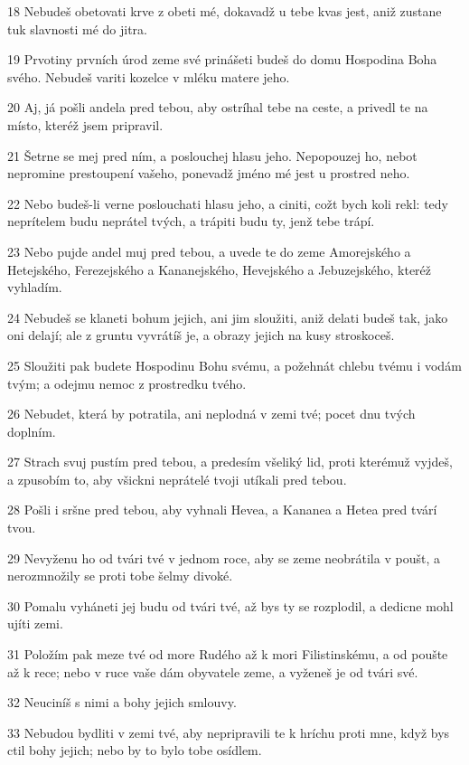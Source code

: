 \par 18 Nebudeš obetovati krve z obeti mé, dokavadž u tebe kvas jest, aniž zustane tuk slavnosti mé do jitra.
\par 19 Prvotiny prvních úrod zeme své prinášeti budeš do domu Hospodina Boha svého. Nebudeš variti kozelce v mléku matere jeho.
\par 20 Aj, já pošli andela pred tebou, aby ostríhal tebe na ceste, a privedl te na místo, kteréž jsem pripravil.
\par 21 Šetrne se mej pred ním, a poslouchej hlasu jeho. Nepopouzej ho, nebot nepromine prestoupení vašeho, ponevadž jméno mé jest u prostred neho.
\par 22 Nebo budeš-li verne poslouchati hlasu jeho, a ciniti, cožt bych koli rekl: tedy neprítelem budu neprátel tvých, a trápiti budu ty, jenž tebe trápí.
\par 23 Nebo pujde andel muj pred tebou, a uvede te do zeme Amorejského a Hetejského, Ferezejského a Kananejského, Hevejského a Jebuzejského, kteréž vyhladím.
\par 24 Nebudeš se klaneti bohum jejich, ani jim sloužiti, aniž delati budeš tak, jako oni delají; ale z gruntu vyvrátíš je, a obrazy jejich na kusy stroskoceš.
\par 25 Sloužiti pak budete Hospodinu Bohu svému, a požehnát chlebu tvému i vodám tvým; a odejmu nemoc z prostredku tvého.
\par 26 Nebudet, která by potratila, ani neplodná v zemi tvé; pocet dnu tvých doplním.
\par 27 Strach svuj pustím pred tebou, a predesím všeliký lid, proti kterémuž vyjdeš, a zpusobím to, aby všickni neprátelé tvoji utíkali pred tebou.
\par 28 Pošli i sršne pred tebou, aby vyhnali Hevea, a Kananea a Hetea pred tvárí tvou.
\par 29 Nevyženu ho od tvári tvé v jednom roce, aby se zeme neobrátila v poušt, a nerozmnožily se proti tobe šelmy divoké.
\par 30 Pomalu vyháneti jej budu od tvári tvé, až bys ty se rozplodil, a dedicne mohl ujíti zemi.
\par 31 Položím pak meze tvé od more Rudého až k mori Filistinskému, a od poušte až k rece; nebo v ruce vaše dám obyvatele zeme, a vyženeš je od tvári své.
\par 32 Neuciníš s nimi a bohy jejich smlouvy.
\par 33 Nebudou bydliti v zemi tvé, aby nepripravili te k hríchu proti mne, když bys ctil bohy jejich; nebo by to bylo tobe osídlem.

